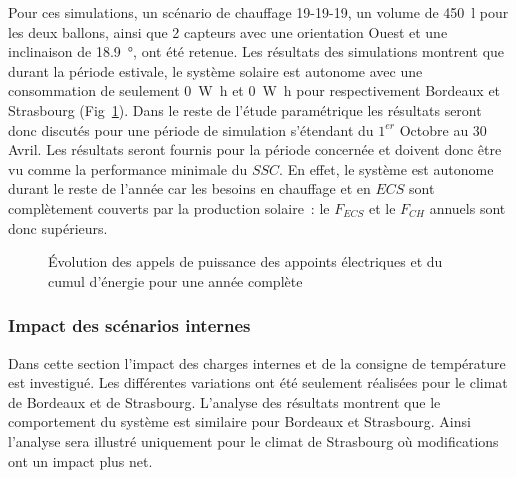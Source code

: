 Pour ces simulations, un scénario de chauffage 19-19-19, un volume de \SI{450}{\litre}
pour les deux ballons, ainsi que \num{2} capteurs avec une orientation Ouest et une
inclinaison de \SI{18.9}{\degree}, ont été retenue. Les résultats des simulations montrent
que durant la période estivale, le système solaire est autonome avec une consommation de
seulement \SI{0}{\watt\hour} et \SI{0}{\watt\hour} pour respectivement Bordeaux et
Strasbourg (Fig~\ref{fig:puissance_annuelle_defavorable}). Dans le reste de l’étude
paramétrique les résultats seront donc discutés pour une période de simulation s’étendant du
$1^{er}$ Octobre au $30$ Avril. Les résultats seront fournis pour la période
concernée et doivent donc être vu comme la performance minimale du $SSC$. En effet, le
système est autonome durant le reste de l’année car les besoins en chauffage et en $ECS$
sont complètement couverts par la production solaire~: le $F_{ECS}$ et le $F_{CH}$ annuels
sont donc supérieurs.

\begin{figure}
    \begin{center}
    \end{center}
    \caption{Évolution des appels de puissance des appoints électriques et du cumul d’énergie pour
             une année complète \label{fig:puissance_annuelle_defavorable}}
\end{figure}



\subsubsection{Impact des scénarios internes} %
\label{ssub:impact_des_scenarios_internes}
Dans cette section l’impact des charges internes et de la consigne de température est
investigué. Les différentes variations ont été seulement réalisées pour le climat
de Bordeaux et de Strasbourg. L’analyse des résultats montrent que le comportement
du système est similaire pour Bordeaux et Strasbourg. Ainsi l’analyse sera illustré
uniquement pour le climat de Strasbourg où modifications ont un impact plus net.

